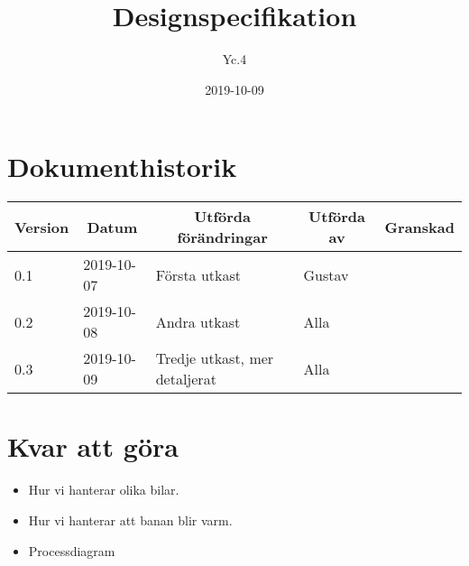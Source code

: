 \documentclass[10pt,oneside,swedish]{lips-no_customer}
\title{Designspecifikation}
\author{Yc.4}
\date{2019-10-09}
\begin{document}
\maketitle

\cleardoublepage
\makeprojectid

\cleardoublepage
\tableofcontents

\cleardoublepage
\section*{Dokumenthistorik}
\begin{tabular}{p{}|p{}|p{}|p{}|p{}} 
  \multicolumn{1}{c}{\bfseries Version} & 
  \multicolumn{1}{|c}{\bfseries Datum} & 
  \multicolumn{1}{|c}{\bfseries Utförda förändringar} & 
  \multicolumn{1}{|c}{\bfseries Utförda av} & 
  \multicolumn{1}{|c}{\bfseries Granskad}\\
  \hline
  \hline
  0.1 & 2019-10-07 & Första utkast & Gustav & \\
  0.2 & 2019-10-08 & Andra utkast & Alla & \\
  0.3 & 2019-10-09 & Tredje utkast, mer detaljerat & Alla & \\
  \hline
\end{tabular}

\cleardoublepage
{}\cfoot{\thepage}






\section{Kvar att göra}
\begin{itemize}
  \item Hur vi hanterar olika bilar.
  \item Hur vi hanterar att banan blir varm.
  \item Processdiagram
\end{itemize}
\end{document}
